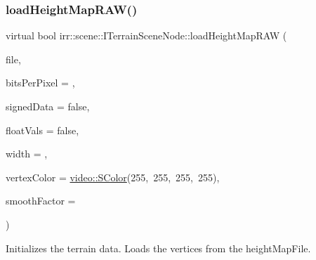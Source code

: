 \subsubsection{\texorpdfstring{load\+Height\+Map\+R\+A\+W()}{loadHeightMapRAW()}\hspace{0.1cm}{\footnotesize\ttfamily [1/2]}}
{\footnotesize\ttfamily virtual bool irr\+::scene\+::\+I\+Terrain\+Scene\+Node\+::load\+Height\+Map\+R\+AW (\begin{DoxyParamCaption}\item[{\hyperlink{classirr_1_1io_1_1IReadFile}{io\+::\+I\+Read\+File} $\ast$}]{file,  }\item[{\hyperlink{namespaceirr_ac66849b7a6ed16e30ebede579f9b47c6}{s32}}]{bits\+Per\+Pixel = {},  }\item[{bool}]{signed\+Data = {\ttfamily false},  }\item[{bool}]{float\+Vals = {\ttfamily false},  }\item[{\hyperlink{namespaceirr_ac66849b7a6ed16e30ebede579f9b47c6}{s32}}]{width = {},  }\item[{\hyperlink{classirr_1_1video_1_1SColor}{video\+::\+S\+Color}}]{vertex\+Color = {\ttfamily \hyperlink{classirr_1_1video_1_1SColor}{video\+::\+S\+Color}(255,~255,~255,~255)},  }\item[{\hyperlink{namespaceirr_ac66849b7a6ed16e30ebede579f9b47c6}{s32}}]{smooth\+Factor = {} }\end{DoxyParamCaption})\hspace{0.3cm}{\ttfamily [pure virtual]}}



Initializes the terrain data. Loads the vertices from the height\+Map\+File. 


